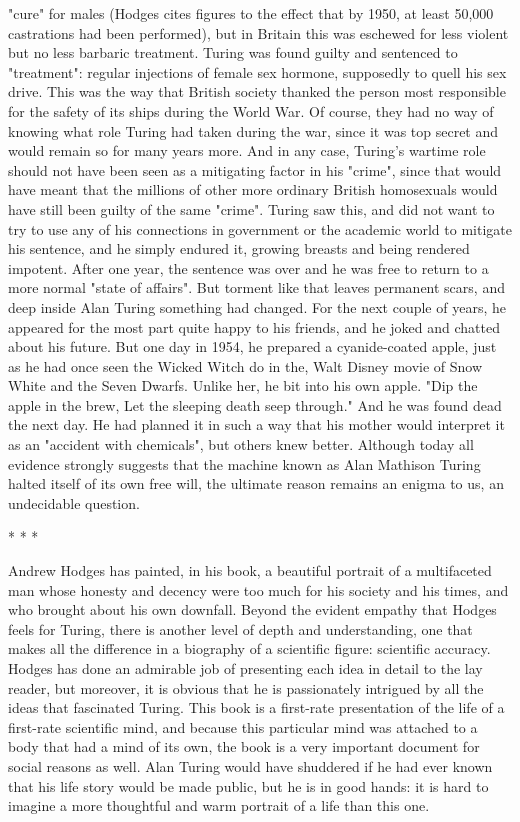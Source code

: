 "cure" for males (Hodges cites figures to the effect that by 1950, at least 50,000
castrations had been performed), but in Britain this was eschewed for less violent but
no less barbaric treatment. Turing was found guilty and sentenced to "treatment":
regular injections of female sex hormone, supposedly to quell his sex drive. This was
the way that British society thanked the person most responsible for the safety of its
ships during the World War. Of course, they had no way of knowing what role Turing
had taken during the war, since it was top secret and would remain so for many years
more. And in any case, Turing's wartime role should not have been seen as a
mitigating factor in his "crime", since that would have meant that the millions of other
more ordinary British homosexuals would have still been guilty of the same "crime".
Turing saw this, and did not want to try to use any of his connections in government
or the academic world to mitigate his sentence, and he simply endured it, growing
breasts and being rendered impotent.
        After one year, the sentence was over and he was free to return to a more
normal "state of affairs". But torment like that leaves permanent scars, and deep
inside Alan Turing something had changed. For the next couple of years, he appeared
for the most part quite happy to his friends, and he joked and chatted about his future.
But one day in 1954, he prepared a cyanide-coated apple, just as he had once seen the
Wicked Witch do in the, Walt Disney movie of Snow White and the Seven Dwarfs.
Unlike her, he bit into his own apple. "Dip the apple in the brew, Let the sleeping
death seep through." And he was found dead the next day. He had planned it in such a
way that his mother would interpret it as an "accident with chemicals", but others
knew better. Although today all evidence strongly suggests that the machine known as
Alan Mathison Turing halted itself of its own free will, the ultimate reason remains an
enigma to us, an undecidable question.

                                    *       *       *

        Andrew Hodges has painted, in his book, a beautiful portrait of a multifaceted
man whose honesty and decency were too much for his society and his times, and
who brought about his own downfall. Beyond the evident empathy that Hodges feels
for Turing, there is another level of depth and understanding, one that makes all the
difference in a biography of a scientific figure: scientific accuracy. Hodges has done
an admirable job of presenting each idea in detail to the lay reader, but moreover, it is
obvious that he is passionately intrigued by all the ideas that fascinated Turing. This
book is a first-rate presentation of the life of a first-rate scientific mind, and because
this particular mind was attached to a body that had a mind of its own, the book is a
very important document for social reasons as well. Alan Turing would have
shuddered if he had ever known that his life story would be made public, but he is in
good hands: it is hard to imagine a more thoughtful and warm portrait of a life than
this one.




